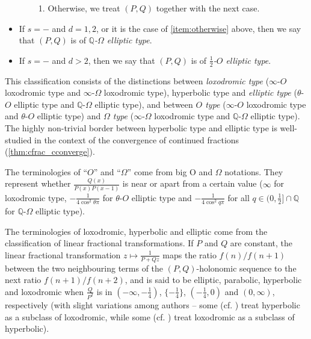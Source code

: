 \documentclass[a4paper,UKenglish,cleveref,autoref,thm-restate]{lipics-v2021}
\newcommand{\Q}{\mathbb{Q}}
\begin{document}
\begin{definition}
\begin{itemize}
\begin{itemize}
\begin{enumerate}[(1)]
\item \label{item:otherwise} Otherwise, we treat $(P, Q)$ together with the next case. 
\end{enumerate}	
\end{itemize}	

\item If $s = -$ and $d = 1, 2$, or it is the case of \eqref{item:otherwise} above, then we say that $(P, Q)$ is of \emph{$\Q$-$\Omega$ elliptic type}. 

\item If $s = -$ and $d > 2$, then we say that $(P, Q)$ is of \emph{$\frac12$-$O$ elliptic type}.
\end{itemize}
\end{definition}

This classification consists of the distinctions between \emph{loxodromic type} ($\infty$-$O$ loxodromic type and $\infty$-$\Omega$ loxodromic type), hyperbolic type and \emph{elliptic type} ($\theta$-$O$ elliptic type and $\Q$-$\Omega$ elliptic type), and between \emph{$O$ type} ($\infty$-$O$ loxodromic type and $\theta$-$O$ elliptic type) and \emph{$\Omega$ type} ($\infty$-$\Omega$ loxodromic type and $\Q$-$\Omega$ elliptic type). 
The highly non-trivial border between hyperbolic type and elliptic type is well-studied in the context of the convergence of continued fractions (\cref{thm:cfrac_cconverge}). 

The terminologies of ``$O$'' and ``$\Omega$'' come from big O and $\Omega$ notations. They represent whether $\frac{Q(x)}{P(x)P(x-1)}$ is near or apart from a certain value ($\infty$ for loxodromic type, $-\frac1{4\cos^2 \theta \pi}$ for $\theta$-$O$ elliptic type and $-\frac1{4\cos^2 q \pi}$  for all $q \in (0, \frac12] \cap \Q$ for $\Q$-$\Omega$ elliptic type).

The terminologies of loxodromic, hyperbolic and elliptic come from the classification of 
linear fractional transformations. 
If $P$ and $Q$ are constant, the linear fractional transformation $z \mapsto \frac1{P+Qz}$ maps the ratio $f (n) / f (n+1)$ between the two neighbouring terms of the $(P, Q)$-holonomic sequence
to the next ratio $f (n + 1) / f (n + 2)$, and is said to be elliptic, parabolic, hyperbolic and loxodromic 
when $\frac{Q}{P^2}$ is in
$(-\infty, -\frac 1 4)$, $\{-\frac 1 4\}$, $(-\frac 1 4, 0)$ and $(0, \infty)$, respectively 
(with slight variations among authors --
some (cf. \cite[\S 4.1.3]{LW08}) treat hyperbolic as a subclass of loxodromic, 
while some (cf. \cite[\S~4.7]{Rat19}) treat loxodromic as a subclass of hyperbolic).
\end{document}
